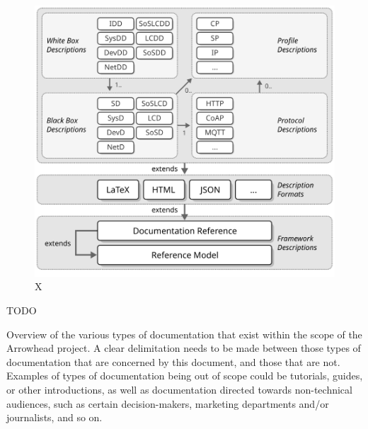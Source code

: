 %
%

\begin{figure}[ht!]
  \centering
  \includegraphics[scale=0.9]{figures/overview}
  \caption{
    X
  }
  \label{fig:overview}
\end{figure}

TODO

Overview of the various types of documentation that exist within the scope of the Arrowhead project.
A clear delimitation needs to be made between those types of documentation that are concerned by this document, and those that are not.
Examples of types of documentation being out of scope could be tutorials, guides, or other introductions, as well as documentation directed towards non-technical audiences, such as certain decision-makers, marketing departments and/or journalists, and so on.
